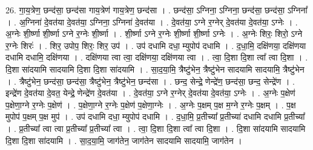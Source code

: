 \documentclass[17pt]{extarticle}
\begin{document}
26. गा॒य॒त्रेण॒ छन्द॑सा॒ छन्द॑सा गाय॒त्रेण॑ गाय॒त्रेण॒ छन्द॑सा । . छन्द॑सा॒ ऽग्निना॒ ऽग्निना॒ छन्द॑सा॒ छन्द॑सा॒ ऽग्निना᳚ । . अ॒ग्निना॑ दे॒वत॑या दे॒वत॑या॒ ऽग्निना॒ ऽग्निना॑ दे॒वत॑या । . दे॒वत॑या॒ ऽग्ने र॒ग्नेर् दे॒वत॑या दे॒वत॑या॒ ऽग्नेः । . अ॒ग्नेः शी॒र्ष्णा शी॒र्ष्णा ऽग्ने र॒ग्नेः शी॒र्ष्णा । . शी॒र्ष्णा ऽग्ने र॒ग्नेः शी॒र्ष्णा शी॒र्ष्णा ऽग्नेः । . अ॒ग्नेः शिरः॒ शिरो॒ ऽग्ने र॒ग्नेः शिरः॑ । . शिर॒ उपोप॒ शिरः॒ शिर॒ उप॑ । . उप॑ दधामि दधा॒ म्युपोप॑ दधामि । . द॒धा॒मि॒ दक्षि॑णया॒ दक्षि॑णया दधामि दधामि॒ दक्षि॑णया । . दक्षि॑णया त्वा त्वा॒ दक्षि॑णया॒ दक्षि॑णया त्वा । . त्वा॒ दि॒शा दि॒शा त्वा᳚ त्वा दि॒शा । . दि॒शा सा॑दयामि सादयामि दि॒शा दि॒शा सा॑दयामि । . सा॒द॒या॒मि॒ त्रैष्टु॑भेन॒ त्रैष्टु॑भेन सादयामि सादयामि॒ त्रैष्टु॑भेन । . त्रैष्टु॑भेन॒ छन्द॑सा॒ छन्द॑सा॒ त्रैष्टु॑भेन॒ त्रैष्टु॑भेन॒ छन्द॑सा । . छन्द॒ सेन्द्रे॒ णेन्द्रे॑ण॒ छन्द॑सा॒ छन्द॒ सेन्द्रे॑ण । . इन्द्रे॑ण दे॒वत॑या दे॒वत॒ येन्द्रे॒ णेन्द्रे॑ण दे॒वत॑या । . दे॒वत॑या॒ ऽग्ने र॒ग्नेर् दे॒वत॑या दे॒वत॑या॒ ऽग्नेः । . अ॒ग्नेः प॒क्षेण॑ प॒क्षेणा॒ग्ने र॒ग्नेः प॒क्षेण॑ । . प॒क्षेणा॒ग्ने र॒ग्नेः प॒क्षेण॑ प॒क्षेणा॒ग्नेः । . अ॒ग्नेः प॒क्षम् प॒क्ष म॒ग्ने र॒ग्नेः प॒क्षम् । . प॒क्ष मुपोप॑ प॒क्षम् प॒क्ष मुप॑ । . उप॑ दधामि दधा॒ म्युपोप॑ दधामि । . द॒धा॒मि॒ प्र॒तीच्या᳚ प्र॒तीच्या॑ दधामि दधामि प्र॒तीच्या᳚ । . प्र॒तीच्या᳚ त्वा त्वा प्र॒तीच्या᳚ प्र॒तीच्या᳚ त्वा । . त्वा॒ दि॒शा दि॒शा त्वा᳚ त्वा दि॒शा । . दि॒शा सा॑दयामि सादयामि दि॒शा दि॒शा सा॑दयामि । . सा॒द॒या॒मि॒ जाग॑तेन॒ जाग॑तेन सादयामि सादयामि॒ जाग॑तेन । \newline
\end{document}
